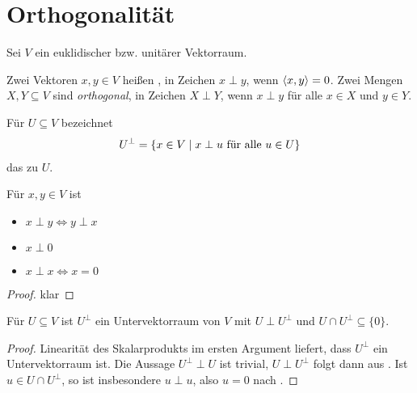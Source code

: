 \section{Orthogonalität}

Sei $V$ ein euklidischer bzw. unitärer Vektorraum.

\begin{definition}
	Zwei Vektoren $x,y\in V$ heißen , in Zeichen $x\perp y$, wenn $\left\langle x,y\right\rangle=0$. Zwei Mengen $X,Y\subseteq V$ sind \emph{orthogonal}, in Zeichen $X\perp Y$, wenn $x\perp y$ für alle $x\in X$ und $y\in Y$.
	
	Für $U\subseteq V$ bezeichnet 
	\begin{align}
		U^{\perp}=\{x\in V\mid x\perp u\text{ für alle } u\in U\}\notag
	\end{align}
	das  zu $U$.
	\begin{center}
	\end{center}
\end{definition}

\begin{lemma}
	Für $x,y\in V$ ist
	\begin{itemize}
		\item $x\perp y\iff y\perp x$
		\item $x\perp 0$
		\item $x\perp x\iff x=0$
	\end{itemize}
\end{lemma}
\begin{proof}
	klar
\end{proof}

\begin{proposition}
	Für $U\subseteq V$ ist $U^\perp$ ein Untervektorraum von $V$ mit $U\perp U^\perp$ und $U\cap U^\perp \subseteq\{0\}$.
\end{proposition}
\begin{proof}
	Linearität des Skalarprodukts im ersten Argument liefert, dass $U^\perp$ ein Untervektorraum ist. Die Aussage $U^\perp \perp U$ ist trivial, $U \perp U^\perp$ folgt dann aus . Ist $u\in U\cap U^\perp$, so ist insbesondere $u\perp u$, also $u=0$ nach .
\end{proof}


